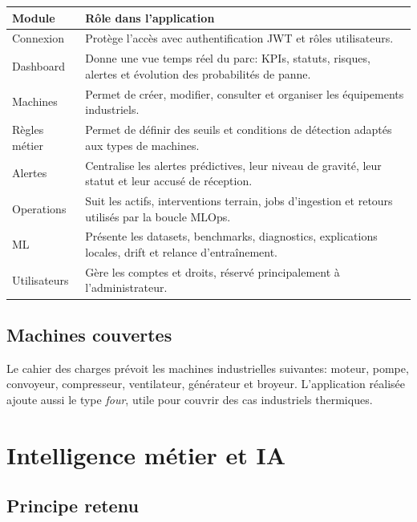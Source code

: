 \documentclass[10pt,a4paper]{article}
\begin{document}
\begin{tabularx}{\textwidth}{p{3.5cm}Y}
\toprule
{}
\textbf{Module} & \textbf{Rôle dans l'application} \\
\midrule
Connexion & Protège l'accès avec authentification JWT et rôles utilisateurs. \\
Dashboard & Donne une vue temps réel du parc: KPIs, statuts, risques, alertes et évolution des probabilités de panne. \\
Machines & Permet de créer, modifier, consulter et organiser les équipements industriels. \\
Règles métier & Permet de définir des seuils et conditions de détection adaptés aux types de machines. \\
Alertes & Centralise les alertes prédictives, leur niveau de gravité, leur statut et leur accusé de réception. \\
Operations & Suit les actifs, interventions terrain, jobs d'ingestion et retours utilisés par la boucle MLOps. \\
ML & Présente les datasets, benchmarks, diagnostics, explications locales, drift et relance d'entraînement. \\
Utilisateurs & Gère les comptes et droits, réservé principalement à l'administrateur. \\
\bottomrule
\end{tabularx}

\subsection{Machines couvertes}

Le cahier des charges prévoit les machines industrielles suivantes: moteur, pompe, convoyeur, compresseur, ventilateur, générateur et broyeur.
L'application réalisée ajoute aussi le type \textit{four}, utile pour couvrir des cas industriels thermiques.

\newpage

\section{Intelligence métier et IA}

\subsection{Principe retenu}
\end{document}
